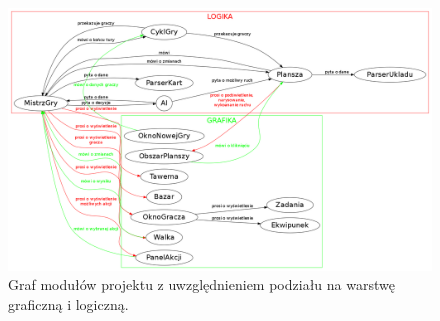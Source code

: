 \documentclass[a4paper, 11pt]{article}
\begin{document}
\newpage

\begin{figure}[ht]

\centering

\includegraphics[scale=0.24]{klasy.png}

\caption{Graf modułów projektu z uwzględnieniem podziału na warstwę graficzną i logiczną.} 

\label{Klasy}

\end{figure}
\end{document}
